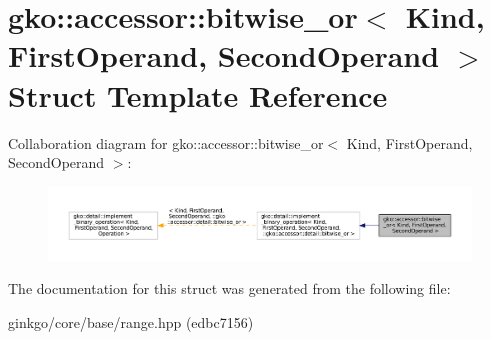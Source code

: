 \hypertarget{structgko_1_1accessor_1_1bitwise__or}{}\section{gko\+:\+:accessor\+:\+:bitwise\+\_\+or$<$ Kind, First\+Operand, Second\+Operand $>$ Struct Template Reference}
\label{structgko_1_1accessor_1_1bitwise__or}


Collaboration diagram for gko\+:\+:accessor\+:\+:bitwise\+\_\+or$<$ Kind, First\+Operand, Second\+Operand $>$\+:
\nopagebreak
\begin{figure}[H]
\begin{center}
\leavevmode
\includegraphics[width=350pt]{structgko_1_1accessor_1_1bitwise__or__coll__graph}
\end{center}
\end{figure}


The documentation for this struct was generated from the following file\+:\begin{DoxyCompactItemize}
\item 
ginkgo/core/base/range.\+hpp (edbc7156)\end{DoxyCompactItemize}
